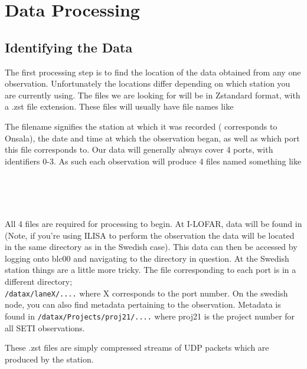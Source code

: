 \documentclass[12pt, onepage]{article}
\numberwithin{equation}{section} %
\begin{document}
\section{Data Processing}
\subsection{Identifying the Data}
The first processing step is to find the location of the data obtained from any one observation. Unfortunately the locations differ depending on which station you are currently using. The files we are looking for will be in Zstandard format, with a .zst file extension. These files will usually have file names like
\begin{center}
\end{center} The filename signifies the station at which it was recorded ( corresponds to Onsala), the date and time at which the observation began, as well as which port this file corresponds to. Our data will generally always cover 4 ports, with identifiers 0-3. As such each observation will produce 4 files named something like
\begin{center}
\\
\\
\\
\end{center}

All 4 files are required for processing to begin. At I-LOFAR, data will be found in  (Note, if you're using ILISA to perform the observation the data will be located in the same directory as in the Swedish case). This data can then be accessed by logging onto blc00 and navigating to the directory in question. At the Swedish station things are a little more tricky. The file corresponding to each port is in a different directory;\\
\texttt{/datax/laneX/....} where X corresponds to the port number. On the swedish node, you can also find metadata pertaining to the observation. Metadata is found in \texttt{/datax/Projects/proj21/....} where proj21 is the project number for all SETI observations.

These .zst files are simply compressed streams of UDP packets which are produced by the station. 
\end{document}
